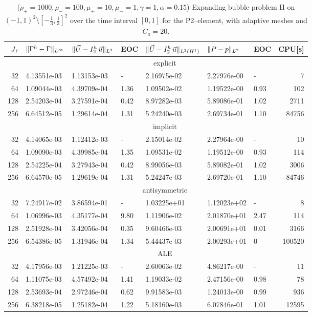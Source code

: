 \begin{table}
\center
\hspace*{-3.25cm}
\begin{tabular}{rllllllr}
\hline
$J_\Gamma$ & $\|\Gamma^h - \Gamma\|_{L^\infty}$ & $\|\vec U - I^h_{2}\,\vec u\|_{L^2}$ & EOC & $\|\vec U - I^h_{2}\,\vec u\|_{L^2(H^1)}$ & $\|P - p\|_{L^2}$ & EOC
& CPU[s] \\
\hline
& \multicolumn{7}{c}{explicit} \\
\hline
 32 & 4.13551e-03 & 1.13153e-03 &    - & 2.16975e-02 & 2.27976e-00 &    - &
7 \\
 64 & 1.09044e-03 & 4.39709e-04 & 1.36 & 1.09502e-02 & 1.19522e-00 & 0.93 &
102 \\
128 & 2.54203e-04 & 3.27591e-04 & 0.42 & 8.97282e-03 & 5.89086e-01 & 1.02 &
2711 \\
256 & 6.64512e-05 & 1.29614e-04 & 1.31 & 5.24240e-03 & 2.69734e-01 & 1.10 &
84756 \\
\hline
& \multicolumn{7}{c}{implicit} \\
\hline
 32 & 4.14065e-03 & 1.12412e-03 &    - & 2.15014e-02 & 2.27964e-00 &    - &
10 \\
 64 & 1.09090e-03 & 4.39985e-04 & 1.35 & 1.09531e-02 & 1.19512e-00 & 0.93 &
114 \\
128 & 2.54225e-04 & 3.27943e-04 & 0.42 & 8.99056e-03 & 5.89082e-01 & 1.02 &
3006 \\
256 & 6.64570e-05 & 1.29619e-04 & 1.31 & 5.24247e-03 & 2.69720e-01 & 1.10 &
84746 \\
\hline
& \multicolumn{7}{c}{antisymmetric} \\
\hline
 32 & 7.24917e-02 & 3.86594e-01 &    - & 1.03225e+01 & 1.12023e+02 &    - &
 8 \\
 64 & 1.06996e-03 & 4.35177e-04 & 9.80 & 1.11906e-02 & 2.01870e+01 & 2.47 &
114 \\
128 & 2.51928e-04 & 3.42056e-04 & 0.35 & 9.60466e-03 & 2.00691e+01 & 0.01 &
3166 \\
256 & 6.54386e-05 & 1.31946e-04 & 1.34 & 5.44437e-03 & 2.00293e+01 &    0 &
100520 \\
\hline
& \multicolumn{7}{c}{ALE} \\
\hline
 32 & 4.17956e-03 & 1.21225e-03 &    - & 2.60063e-02 & 4.86217e-00 &    - &
11 \\
 64 & 1.11075e-03 & 4.57492e-04 & 1.41 & 1.19033e-02 & 2.47156e-00 & 0.98 &
78 \\
128 & 2.53693e-04 & 2.97246e-04 & 0.62 & 9.91583e-03 & 1.24013e-00 & 0.99 &
936 \\
256 & 6.38218e-05 & 1.25182e-04 & 1.22 & 5.18160e-03 & 6.07846e-01 & 1.01 &
12595 \\
\hline
\end{tabular}
\hspace*{-3.25cm}
\caption[Navier--Stokes expanding bubble II errors P2--\pdg]
{($\rho_+ = 1000,\rho_- = 100,\mu_+ = 10,\mu_- =1,\gamma = 1,\alpha=0.15$)
Expanding bubble problem II on $(-1,1)^2\setminus[-\frac{1}{3},\frac{1}{3}]^2$
over the time interval $[0,1]$ for the P2--\pdg element, with adaptive
meshes and $C_a=20$\textdegree.}
\label{tab:nsexpandingbubbleIIp2p1dg}
\end{table}
